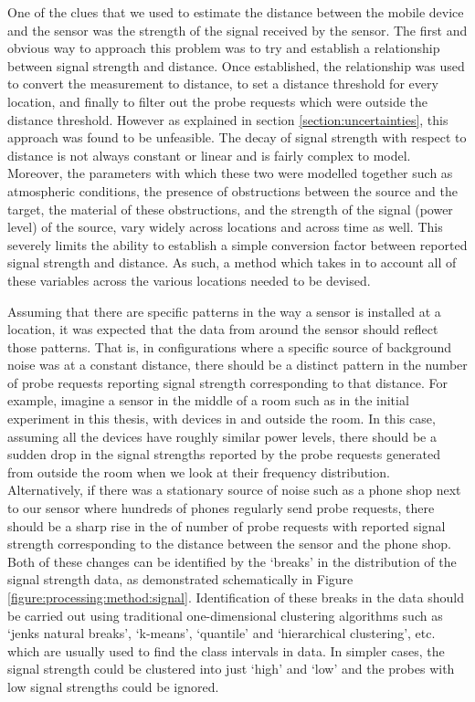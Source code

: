 One of the clues that we used to estimate the distance between the mobile device and the sensor was the strength of the signal received by the sensor.
The first and obvious way to approach this problem was to try and establish a relationship between signal strength and distance.
Once established, the relationship was used to convert the measurement to distance, to set a distance threshold for every location, and finally to filter out the probe requests which were outside the distance threshold.
However as explained in section \ref{section:uncertainties}, this approach was found to be unfeasible.
The decay of signal strength with respect to distance is not always constant or linear and is fairly complex to model.
Moreover, the parameters with which these two were modelled together such as atmospheric conditions, the presence of obstructions between the source and the target, the material of these obstructions, and the strength of the signal (power level) of the source, vary widely across locations and across time as well.
This severely limits the ability to establish a simple conversion factor between reported signal strength and distance.
As such, a method which takes in to account all of these variables across the various locations needed to be devised.

Assuming that there are specific patterns in the way a sensor is installed at a location, it was expected that the data from around the sensor should reflect those patterns.
That is, in configurations where a specific source of background noise was at a constant distance, there should be a distinct pattern in the number of probe requests reporting signal strength corresponding to that distance.
For example, imagine a sensor in the middle of a room such as in the initial experiment in this thesis, with devices in and outside the room.
In this case, assuming all the devices have roughly similar power levels, there should be a sudden drop in the signal strengths reported by the probe requests generated from outside the room when we look at their frequency distribution.
Alternatively, if there was a stationary source of noise such as a phone shop next to our sensor where hundreds of phones regularly send probe requests, there should  be a sharp rise in the of number of probe requests with reported signal strength corresponding to the distance between the sensor and the phone shop.
Both of these changes can be identified by the ‘breaks’ in the distribution of the signal strength data, as demonstrated schematically in Figure \ref{figure:processing:method:signal}.
Identification of these breaks in the data should be carried out using traditional one-dimensional clustering algorithms such as ‘jenks natural breaks’, ‘k-means’, ‘quantile’ and ‘hierarchical clustering’, etc.
 which are usually used to find the class intervals in data.
In simpler cases, the signal strength could be clustered into just ‘high’ and ‘low’ and the probes with low signal strengths could be ignored.

